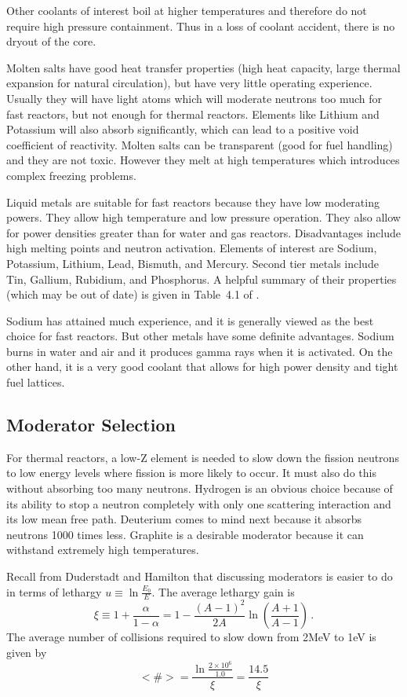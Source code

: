Other coolants of interest boil at higher temperatures and therefore do not require high pressure containment. Thus in a loss of coolant accident, there is no dryout of the core. 

Molten salts have good heat transfer properties (high heat capacity, large thermal expansion for natural circulation), but have very little operating experience. 
Usually they will have light atoms which will moderate neutrons too much for fast reactors, but not enough for thermal reactors.
Elements like Lithium and Potassium will also absorb significantly, which can lead to a positive void coefficient of reactivity.
Molten salts can be transparent (good for fuel handling) and they are not toxic.
However they melt at high temperatures which introduces complex freezing problems.
 
Liquid metals are suitable for fast reactors because they have low moderating powers.
They allow high temperature and low pressure operation. They also allow for power densities greater than for water and gas reactors.
Disadvantages include high melting points and neutron activation.
Elements of interest are Sodium, Potassium, Lithium, Lead, Bismuth, and Mercury. 
Second tier metals include Tin, Gallium, Rubidium, and Phosphorus. A helpful summary of their properties (which may be out of date) is given in Table~4.1 of \cite{Graham}.

Sodium has attained much experience, and it is generally viewed as the best choice for fast reactors. But other metals have some definite advantages.
Sodium burns in water and air and it produces gamma rays when it is activated. 
On the other hand, it is a very good coolant that allows for high power density and tight fuel lattices.

\subsection{Moderator Selection}
For thermal reactors, a low-Z element is needed to slow down the fission neutrons to low energy levels where fission is more likely to occur. It must also do this without absorbing too many neutrons. Hydrogen is an obvious choice because of its ability to stop a neutron completely with only one scattering interaction and its low mean free path. Deuterium comes to mind next because it absorbs neutrons 1000 times less. Graphite is a desirable moderator because it can withstand extremely high temperatures.

Recall from Duderstadt and Hamilton\cite{Duderstadt} that discussing moderators is easier to do in terms of lethargy $u \equiv \ln \frac{E_0}{E}$. 
The average lethargy gain is 
\begin{equation}
\xi \equiv 1+ \frac{\alpha}{1-\alpha} = 
     1- \frac{(A-1)^2}{2A} \ln \left( \frac{A+1}{A-1} \right)\,.
\end{equation}
The average number of collisions required to slow down from 2MeV to 1eV is given by
\begin{equation}
  <\#>=\frac{\ln \frac{2\times10^6}{1.0}}{\xi}=\frac{14.5}{\xi}
\end{equation}

